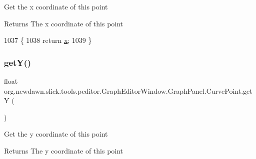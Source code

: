 Get the x coordinate of this point

\begin{DoxyReturn}{Returns}
The x coordinate of this point 
\end{DoxyReturn}

\begin{DoxyCode}
1037                                 \{
1038                 \textcolor{keywordflow}{return} \mbox{\hyperlink{classorg_1_1newdawn_1_1slick_1_1tools_1_1peditor_1_1_graph_editor_window_1_1_graph_panel_1_1_curve_point_a047a6ee9ca0a301f32471ca8dbff20fe}{x}};
1039             \}
\end{DoxyCode}
\mbox{\label{classorg_1_1newdawn_1_1slick_1_1tools_1_1peditor_1_1_graph_editor_window_1_1_graph_panel_1_1_curve_point_a397cd6f57a2a6cc9eec2a0d3311ba8ce}} 
\subsubsection{\texorpdfstring{get\+Y()}{getY()}}
{\footnotesize\ttfamily float org.\+newdawn.\+slick.\+tools.\+peditor.\+Graph\+Editor\+Window.\+Graph\+Panel.\+Curve\+Point.\+getY (\begin{DoxyParamCaption}{ }\end{DoxyParamCaption})\hspace{0.3cm}{\ttfamily [inline]}}

Get the y coordinate of this point

\begin{DoxyReturn}{Returns}
The y coordinate of this point 
\end{DoxyReturn}

